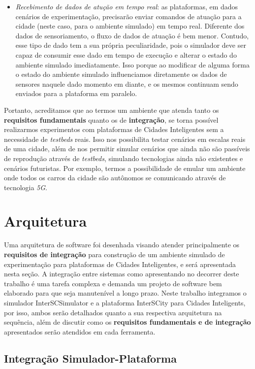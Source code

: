 \begin{itemize}
    \item \textit{Recebimento de dados de atução em tempo real}: as plataformas, em dados cenários de experimentação, precisarão enviar comandos de atuação para a cidade (neste caso,
        para o ambiente simulado) em tempo real.
        Diferente dos dados de sensoriamento, o fluxo de dados de atuação é bem menor.
        Contudo, esse tipo de dado tem a sua própria peculiaridade, pois o simulador deve ser capaz de consumir esse dado em tempo de execução e alterar o estado do ambiente simulado
        imediatamente.
        Isso porque ao modificar de alguma forma o estado do ambiente simulado influenciamos diretamente os dados de sensores naquele dado momento em diante, e os mesmos continuam
        sendo enviados para a plataforma em paralelo.
\end{itemize}

Portanto, acreditamos que ao termos um ambiente que atenda tanto os \textbf{requisitos fundamentais} quanto os de \textbf{integração}, se torna possível realizarmos experimentos
com plataformas de Cidades Inteligentes sem a necessidade de \textit{testbeds} reais.
Isso nos possibilita testar cenários em escalas reais de uma cidade, além de nos permitir simular cenários que ainda não são passíveis de reprodução através de \textit{testbeds},
simulando tecnologias ainda não existentes e cenários futuristas.
Por exemplo, termos a possibilidade de emular um ambiente onde todos os carros da cidade são autônomos se comunicando através de tecnologia \textit{5G}.

\section{Arquitetura}

Uma arquitetura de software foi desenhada visando atender principalmente os \textbf{requisitos de integração} para construção de um ambiente simulado de experimentação para plataformas
de Cidades Inteligentes, e será apresentada nesta seção.
A integração entre sistemas como apresentando no decorrer deste trabalho é uma tarefa complexa e demanda um projeto de software bem elaborado para que seja manutenível a longo prazo.
Neste trabalho integramos o simulador InterSCSimulator e a plataforma InterSCity para Cidades Inteligents, por isso, ambos serão detalhados quanto a sua respectiva arquitetura na
sequência, além de discutir como os \textbf{requisitos fundamentais e de integração} apresentados serão atendidos em cada ferramenta.

\subsection{Integração Simulador-Plataforma}

